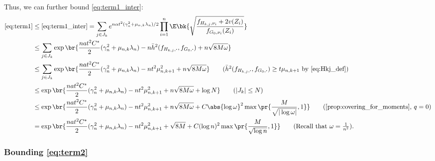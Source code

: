 \documentclass[12pt, reqno]{amsart}
\newcommand{\fs}[1]{f_{#1, \boldsymbol{\cdot}}}
\newcommand{\barh}{\bar h}
\numberwithin{equation}{section}
\begin{document}
\begin{refsection}
\begin{appendices}
Thus, we can further bound \eqref{eq:term1_inter}: \begin{align*}
\eqref{eq:term1} &\le \eqref{eq:term1_inter} = \sum_{j\in J_k} e^{n \alpha t^2
(\gamma_n^2 +
\mu_{n,k}
\lambda_n)/2} \prod_{i=1}^n \E
\bk{
    \sqrt{\frac{f_{H_{k,j}, \nu_i} + 2v(Z_i)}{f_{G_0, \nu_i}
    (Z_i)}}
    }
\\
    &\le  \sum_{j\in J_k} \exp\br{
    \frac{na t^2C^*}{2} (\gamma_n^2 + \mu_{n,k}\lambda_n) - n \barh^2(
    \fs{H_{k,j}}, \fs{G_0} )+ n \sqrt{8M\omega}
    } \\
    & \le \sum_{j\in J_k} \exp\br{
    \frac{na t^2C^*}{2} (\gamma_n^2 + \mu_{n,k}\lambda_n) - n t^2 \mu_{n,k+1}^2 + n
    \sqrt{8M\omega}
    } \tag{$\barh^2(
    \fs{H_{k,j}}, \fs{G_0}) \ge t \mu_{n,k+1}$ by \eqref{eq:Hkj_def}} \\
    &\le  \exp\br{
    \frac{na t^2C^*}{2} (\gamma_n^2 + \mu_{n,k}\lambda_n) - n t^2 \mu_{n,k+1}^2 + n
    \sqrt{8M\omega} + \log N
    } \tag{$|J_k| \le N$} \\
    & \le \exp\br{
    \frac{na t^2C^*}{2} (\gamma_n^2 + \mu_{n,k}\lambda_n) - n t^2 \mu_{n,k+1}^2 + n
    \sqrt{8M\omega} + C \abs{\log \omega}^2 \max\pr{\frac{M}{\sqrt{|\log \omega|}}, 1}
    } \tag{\cref{prop:covering_for_moments}, $q=0$} \\
    &= \exp\br{
    \frac{na t^2C^*}{2} (\gamma_n^2 + \mu_{n,k}\lambda_n) - n t^2 \mu_{n,k+1}^2 +
    \sqrt{8M} + C (\log n)^2 \max\pr{\frac{M}{\sqrt{\log n}}, 1}
    }  \tag{Recall that $\omega = \frac{1}{n^2}$}.
\end{align*}

\subsubsection{Bounding \eqref{eq:term2}}


\end{appendices}
\end{refsection}
\end{document}
